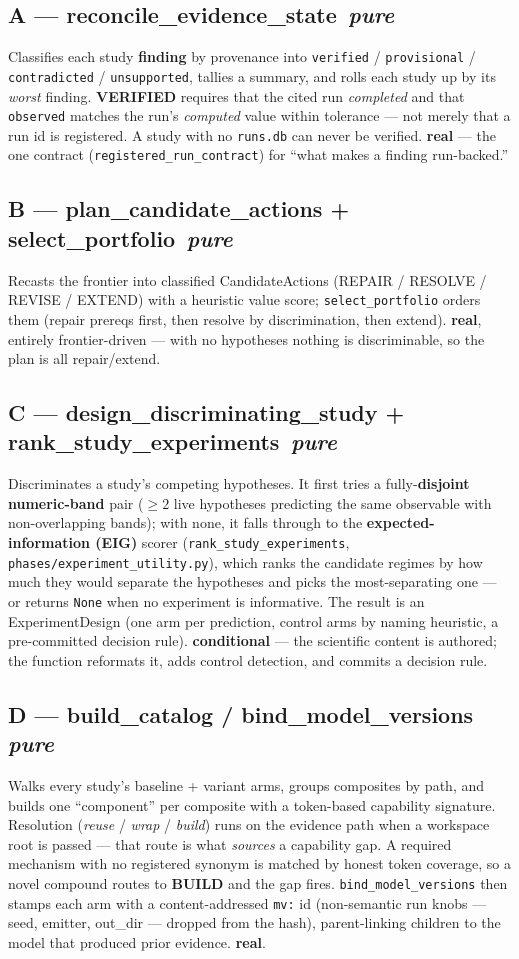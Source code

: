 \documentclass[11pt]{article}
\newcommand{\code}[1]{\texttt{\small #1}}
\newcommand{\real}{\textcolor{good}{\textbf{real}}}
\newcommand{\cond}{\textcolor{warn}{\textbf{conditional}}}
\newcommand{\stage}[2]{\subsection*{\textcolor{accent}{#1}\, \normalfont\textit{\small #2}}}
\begin{document}
\stage{A --- reconcile\_evidence\_state}{pure}
Classifies each study \textbf{finding} by provenance into \code{verified} / \code{provisional} /
\code{contradicted} / \code{unsupported}, tallies a summary, and rolls each study up by its
\emph{worst} finding. \textbf{VERIFIED} requires that the cited run \emph{completed} and that
\code{observed} matches the run's \emph{computed} value within tolerance --- not merely that a
run id is registered. A study with no \code{runs.db} can never be verified. \real{} --- the one
contract (\code{registered\_run\_contract}) for ``what makes a finding run-backed.''

\stage{B --- plan\_candidate\_actions + select\_portfolio}{pure}
Recasts the frontier into classified CandidateActions (REPAIR / RESOLVE / REVISE / EXTEND) with a
heuristic value score; \code{select\_portfolio} orders them (repair prereqs first, then resolve
by discrimination, then extend). \real, entirely frontier-driven --- with no hypotheses nothing
is discriminable, so the plan is all repair/extend.

\stage{C --- design\_discriminating\_study {\normalfont+} rank\_study\_experiments}{pure}
Discriminates a study's competing hypotheses. It first tries a fully-\textbf{disjoint numeric-band}
pair ($\geq 2$ live hypotheses predicting the same observable with non-overlapping bands); with none,
it falls through to the \textbf{expected-information (EIG)} scorer (\code{rank\_study\_experiments},
\code{phases/experiment\_utility.py}), which ranks the candidate regimes by how much they would
separate the hypotheses and picks the most-separating one --- or returns \code{None} when no
experiment is informative. The result is an ExperimentDesign (one arm per prediction, control arms
by naming heuristic, a pre-committed decision rule). \cond{} --- the scientific content is authored;
the function reformats it, adds control detection, and commits a decision rule.

\stage{D --- build\_catalog / bind\_model\_versions}{pure}
Walks every study's baseline + variant arms, groups composites by path, and builds one
``component'' per composite with a token-based capability signature. Resolution
(\emph{reuse} / \emph{wrap} / \emph{build}) runs on the evidence path when a workspace root is
passed --- that route is what \emph{sources} a capability gap. A required mechanism with no
registered synonym is matched by honest token coverage, so a novel compound routes to
\textbf{BUILD} and the gap fires. \code{bind\_model\_versions} then stamps each arm with a
content-addressed \code{mv:} id (non-semantic run knobs --- seed, emitter, out\_dir --- dropped
from the hash), parent-linking children to the model that produced prior evidence. \real.
\end{document}
